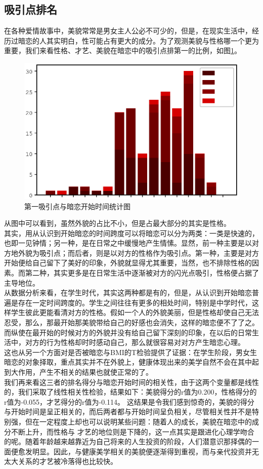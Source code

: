 \documentclass[10pt, a4paper, twocolumn]{ctexart}
\begin{document}
\subsection{吸引点排名}
在各种爱情故事中，美貌常常是男女主人公必不可少的，但是，在现实生活中，经历过暗恋的人其实明白，性可能占有更大的成分。为了观测美貌与性格哪一个更为重要，我们来看性格、才艺、美貌在暗恋中的吸引点排第一的比例，如图\ref{c6}。
\begin{figure}[htbp]
	\centering
	\label{c6}
	\includegraphics[width = 0.8\linewidth]{c6.eps}
	\caption{第一吸引点与暗恋开始时间统计图} %
\end{figure}

从图中可以看到，虽然外貌的占比不小，但是占最大部分的其实是性格。\\
其实，用从认识到开始暗恋的时间跨度可以将暗恋可以分为两类：一类是快速的，也即一见钟情；另一种，是在日常之中缓慢地产生情愫。显然，前一种主要是以对方地外貌为吸引点；而后者，则是以对方的性格作为吸引点。第一种，主要是对方开始便给自己留下了美好的印象，外貌就显得尤其重要，当然，也不排除性格的因素。而第二种，其实更多是在日常生活中逐渐被对方的闪光点吸引，性格便占据了主导地位。\\
\indent 从数据分析来看，在学生时代，其实这两种都是有的，但是，从认识到开始暗恋普遍是存在一定时间跨度的。学生之间往往有更多的相处时间，特别是中学时代，这样学生彼此更能看清对方的性格。假如一个人的外貌美丽，但是性格却使自己无法忍受，那么，那最开始那美貌带给自己的好感也会消失，这样的暗恋便不了了之。而纵使在最开始的时候对方的外貌并没有给自己留下深刻的印象，在以后的日常生活中，对方的行为性格却时时感动自己，那么就很容易对对方产生暗恋心理。\\
\indent 这也从另一个方面对是否被暗恋与BMI的T检验提供了证据：在学生阶段，男女生暗恋的对象择取，重点其实并不在外貌上，健康体现出来的美学自然不会在其中起到大作用，产生不相关的结果也就使正常的了。\\
\indent 我们再来看这三者的排名得分与暗恋开始时间的相关性，由于这两个变量都是线性的，我们采取了线性相关性检验，结果如下：美貌得分的r值为0.200，性格得分的r值为-0.055，才艺得分的r值为-0.114。
这结果是令我们感到惊奇的，美貌的得分与开始时间是呈正相关的，而后两者都与开始时间呈负相关，尽管相关性并不是特别强，但在一定程度上却也可以说明某些问题：随着人的成长，美貌在暗恋中的成分不断上升，而性格与 才艺的地位则是下降的，这一点其实是跟进化心理学吻合的呢。随着年龄越来越靠近为自己将来的人生投资的阶段，人们潜意识那择偶的一面便愈发明显。因此，与健康美学相关的美貌便逐渐得到重视，而与亲代投资并无太大关系的才艺被冷落得也比较快。\\
\end{document}

